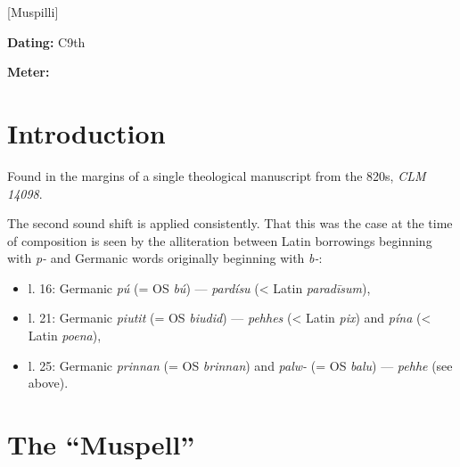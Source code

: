 [Muspilli]

\begin{flushright}%
\textbf{Dating:} C9th

\textbf{Meter:} \Fornyrdislag%
\end{flushright}%

\section{Introduction}

Found in the margins of a single theological manuscript from the 820s, \emph{CLM 14098}.

The second sound shift is applied consistently.  That this was the case at the time of composition is seen by the alliteration between Latin borrowings beginning with \emph{p-} and Germanic words originally beginning with \emph{b-}:

\begin{itemize}
  \item l. 16: Germanic \emph{pú} (= OS \emph{bú}) — \emph{pardísu} (< Latin \emph{paradīsum}),
  \item l. 21: Germanic \emph{piutit} (= OS \emph{biudid}) — \emph{pehhes} (< Latin \emph{pix}) and \emph{pína} (< Latin \emph{poena}),
  \item l. 25: Germanic \emph{prinnan} (= OS \emph{brinnan}) and \emph{palw-} (= OS \emph{balu}) — \emph{pehhe} (see above).
\end{itemize}

\sectionline

\section{The “Muspell”}

